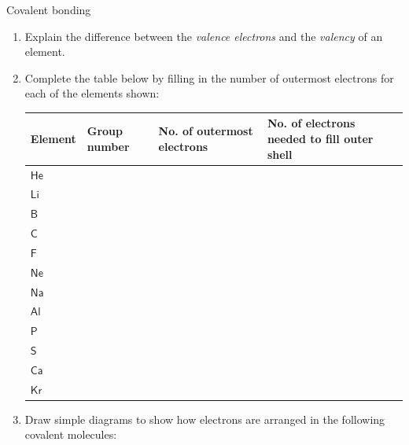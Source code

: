             \begin{exercises}{Covalent bonding
        }
            \nopagebreak
        \label{m38704*id139588}\begin{enumerate}[noitemsep, label=\textbf{\arabic*}. ] 
            \label{m38704*uid10}\item Explain the difference between the \textsl{valence electrons} and the \textsl{valency} of an element.\newline
\label{m38704*uid11}\item Complete the table below by filling in the number of outermost electrons for each of the elements shown:
          \begin{table}[H]
        \begin{center}
      \label{m38704*id139625}
    \noindent
      \begin{tabular}{|l|l|p{3cm}|p{3cm}|}\hline
\textbf{Element} & \textbf{Group number} & \textbf{No. of outermost electrons} & \textbf{No. of electrons needed to fill outer shell}  \\ \hline
        $\mathsf{He}$ & & & \\ \hline
        $\mathsf{Li}$ & & & \\ \hline
        $\mathsf{B}$ & & & \\ \hline
        $\mathsf{C}$ & & & \\ \hline
        $\mathsf{F}$ & & & \\ \hline
        $\mathsf{Ne}$ & & & \\ \hline
        $\mathsf{Na}$ & & & \\ \hline
        $\mathsf{Al}$ & & & \\ \hline
        $\mathsf{P}$ & & & \\ \hline
        $\mathsf{S}$ & & & \\ \hline
        $\mathsf{Ca}$ & & & \\ \hline
        $\mathsf{Kr}$ & & & \\ \hline
    \end{tabular}
      \end{center}
\end{table}
    \par
          \label{m38704*uid12}\item Draw simple diagrams to show how electrons are arranged in the following covalent molecules:

\end{enumerate}
\end{exercises}
